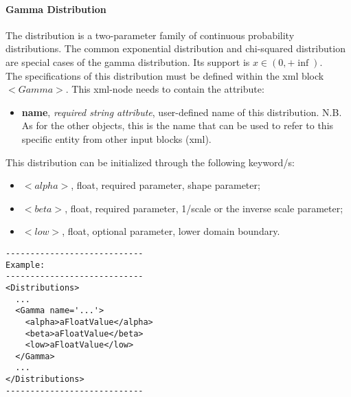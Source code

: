 \paragraph{Gamma Distribution}
\label{Gamma}
The  distribution is a two-parameter family of continuous probability distributions. The common exponential distribution and chi-squared distribution are special cases of the gamma distribution.  Its support is $x \in (0,+\inf)$.
\\ The specifications of this distribution must be defined within the xml block $<Gamma>$. This xml-node needs to contain the attribute:
\vspace{-5mm}
\begin{itemize}
\itemsep0em
\item \textbf{name}, \textit{required string attribute}, user-defined name of this distribution. N.B. As for the other objects, this is the name that can be used to refer to this specific entity from other input blocks (xml).   
\end{itemize}
\vspace{-5mm}
This distribution can be initialized through the following keyword/s:
\begin{itemize}
\item $<alpha>$, float, required parameter, shape parameter;
\item $<beta>$, float, required parameter, 1/scale or the inverse scale parameter;
\item $<low>$, float, optional parameter,  lower domain boundary.
\end{itemize}

\begin{lstlisting}[style=XML]
----------------------------
Example:
----------------------------
<Distributions>
  ...
  <Gamma name='...'>
    <alpha>aFloatValue</alpha>
    <beta>aFloatValue</beta>
    <low>aFloatValue</low>
  </Gamma>
  ...
</Distributions>
----------------------------
\end{lstlisting}

